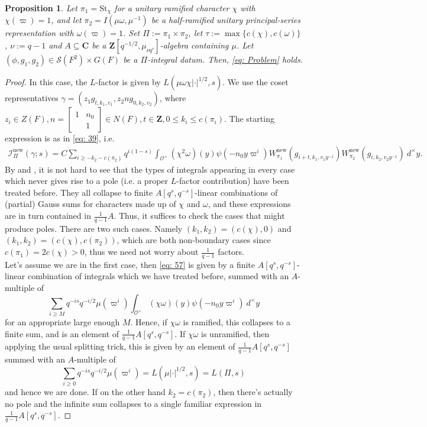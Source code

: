 \documentclass{amsart}
\theoremstyle{plain}
\newtheorem{prop}[thm]{Proposition}
\theoremstyle{plain}
\theoremstyle{remark}
\begin{document}
\begin{prop}
    Let $\pi_1=\mathrm{St}_\chi$ for a unitary ramified character $\chi$ with $\chi(\varpi)=1$, and let $\pi_2=I(\mu\omega,\mu^{-1})$ be a half-ramified unitary principal-series representation with $\omega(\varpi)=1$. Set $\Pi:=\pi_1\times \pi_2$, let $\tau:=\max\{c(\chi),c(\omega)\}$, $\nu:=q-1$ and $A\subseteq\mathbf{C}$ be a $\mathbf{Z}[q^{-1/2},\mu_{\nu q^\tau}]$-algebra containing $\mu$. Let $(\phi,g_1,g_2)\in\mathcal{S}(F^2)\times G(F)$ be a $\Pi$-integral datum. Then, \eqref{eq: Problem} holds.
\end{prop}
\begin{proof}
    In this case, the $L$-factor is given by $L(\mu\omega\chi|\cdot|^{1/2},s)$.  We use the coset representatives $\gamma=(z_1g_{t,k_1,v_1},z_2ng_{0,k_2,v_2})$, where $z_i\in Z(F),n=\left[\begin{smallmatrix}
            1 & n_0\\
            & 1
        \end{smallmatrix}\right]\in N(F),t\in\mathbf{Z}, 0\leq k_i\leq c(\pi_i)$. The starting expression is as in \eqref{eq: 39}, i.e.
        \begin{align}\label{eq: 57}
            {\mathcal{I}_{\Pi}^\mathrm{new}(\gamma;s)=C\sum_{i\geq -k_2-c(\pi_2)}q^{i(1-s)}\int_{\mathcal{O}^\times}(\chi^2\omega)(y)\psi(-n_0y\varpi^i)W_{\pi_1}^\mathrm{new}(g_{i+t,k_1,v_1y^{-1}})W_{\pi_2}^\mathrm{new}(g_{i,k_2,v_2y^{-1}})\ d^\times y}.
        \end{align}
        By \cite[Lemma $3.3$]{Assing_2018} and , it is not hard to see that the types of integrals appearing in every case which never gives rise to a pole (i.e. a proper $L$-factor contribution) have been treated before. They all collapse to finite $A[q^s,q^{-s}]$-linear combinations of (partial) Gauss sums for characters made up of $\chi$ and $\omega$, and these expressions are in turn contained in $\tfrac{1}{q-1}A$. Thus, it suffices to check the cases that might produce poles. There are two such cases. Namely $(k_1,k_2)=(c(\chi),0)$ and $(k_1,k_2)=(c(\chi),c(\pi_2))$, which are both non-boundary cases since $c(\pi_1)=2c(\chi)>0$, thus we need not worry about $\tfrac{1}{q-1}$ factors. \\
        Let's assume we are in the first case, then \eqref{eq: 57} is given by a finite $A[q^s,q^{-s}]$-linear combination of integrals which we have treated before, summed with an $A$-multiple of 
        $$\sum_{i\geq M}q^{-is}q^{-i/2} \mu(\varpi^i)\int_{\mathcal{O}^\times}(\chi\omega)(y)\psi(-n_0y\varpi^i)\ d^\times y$$
        for an appropriate large enough $M$.
Hence, if $\chi\omega$ is ramified, this collapses to a finite sum, and is an element of $\tfrac{1}{q-1}A[q^s,q^{-s}]$. If $\chi\omega$ is unramified, then applying the usual splitting trick, this is given by an element of $\tfrac{1}{q-1}A[q^s,q^{-s}]$ summed with an $A$-multiple of 
$$\sum_{i\geq 0}q^{-is}q^{-i/2}\mu(\varpi^i)=L(\mu|\cdot|^{1/2},s)=L(\Pi,s)$$
and hence we are done. If on the other hand $k_2=c(\pi_2)$, then there's actually no pole and the infinite sum collapses to a single familiar expression in $\tfrac{1}{q-1}A[q^s,q^{-s}]$.
\end{proof}
\end{document}
